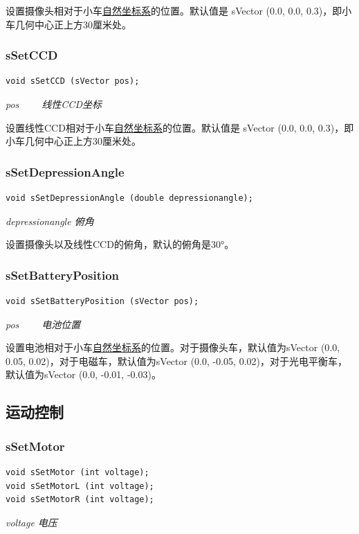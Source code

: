 \documentclass[titlepage,a4paper]{ctexart}
\begin{document}
设置摄像头相对于小车\hyperlink{coord}{自然坐标系}的位置。默认值是 sVector (0.0, 0.0, 0.3)，即小车几何中心正上方30厘米处。 \\

\subsubsection{sSetCCD}
\begin{lstlisting}[numbers=none]
void sSetCCD (sVector pos);
\end{lstlisting}
\par \emph{pos 　　线性CCD坐标}

设置线性CCD相对于小车\hyperlink{coord}{自然坐标系}的位置。默认值是 sVector (0.0, 0.0, 0.3)，即小车几何中心正上方30厘米处。 \\

\subsubsection{sSetDepressionAngle}
\begin{lstlisting}[numbers=none]
void sSetDepressionAngle (double depressionangle);
\end{lstlisting}
\par \emph{depressionangle 俯角}

设置摄像头以及线性CCD的俯角，默认的俯角是30°。 \\

\subsubsection{sSetBatteryPosition}
\begin{lstlisting}[numbers=none]
void sSetBatteryPosition (sVector pos);
\end{lstlisting}
\par \emph{pos 　　电池位置}

设置电池相对于小车\hyperlink{coord}{自然坐标系}的位置。对于摄像头车，默认值为sVector (0.0, 0.05, 0.02)，对于电磁车，默认值为sVector (0.0, -0.05, 0.02)，对于光电平衡车，默认值为sVector (0.0, -0.01, -0.03)。 \\

\subsection{运动控制}
\subsubsection{sSetMotor}
\begin{lstlisting}[numbers=none]
void sSetMotor (int voltage);
void sSetMotorL (int voltage);
void sSetMotorR (int voltage);
\end{lstlisting}
\par \emph{voltage 电压}
\end{document}

